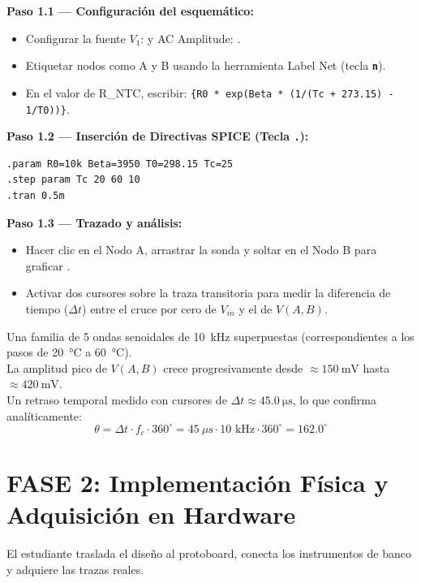 \documentclass[11pt,a4paper]{article}
\newcommand{\tecla}[1]{\colorbox{gray!20}{\texttt{\footnotesize\textbf{#1}}}}
\newcommand{\spice}[1]{\texttt{\color{purple}#1}}
\begin{document}
\textbf{Paso 1.1 — Configuración del esquemático:}
\begin{itemize}[itemsep=1pt]
    \item Configurar la fuente $V_1$:  y AC Amplitude: .
    \item Etiquetar nodos como A y B usando la herramienta Label Net (tecla \tecla{n}).
    \item En el valor de R\_NTC, escribir: \spice{\{R0 * exp(Beta * (1/(Tc + 273.15) - 1/T0))\}}.
\end{itemize}

\textbf{Paso 1.2 — Inserción de Directivas SPICE (Tecla \tecla{.}):}
\begin{lstlisting}[language=SPICE, numbers=none]
.param R0=10k Beta=3950 T0=298.15 Tc=25
.step param Tc 20 60 10
.tran 0.5m
\end{lstlisting}

\textbf{Paso 1.3 — Trazado y análisis:}
\begin{itemize}[itemsep=1pt]
    \item Hacer clic en el Nodo A, arrastrar la sonda y soltar en el Nodo B para graficar .
    \item Activar dos cursores sobre la traza transitoria para medir la diferencia de tiempo ($\Delta t$) entre el cruce por cero de $V_{in}$ y el de $V(A,B)$.
\end{itemize}

\begin{resultado}
Una familia de 5 ondas senoidales de \qty{10}{\kilo\hertz} superpuestas (correspondientes a los pasos de \qty{20}{\celsius} a \qty{60}{\celsius}).\\
La amplitud pico de $V(A,B)$ crece progresivamente desde $\approx \qty{150}{\milli\volt}$ hasta $\approx \qty{420}{\milli\volt}$.\\
Un retraso temporal medido con cursores de $\Delta t \approx \qty{45.0}{\micro\second}$, lo que confirma analíticamente:
\begin{equation}
    \theta = \Delta t \cdot f_c \cdot 360^\circ = 45\ \mu\text{s} \cdot 10\text{ kHz} \cdot 360^\circ = 162.0^\circ
\end{equation}
\end{resultado}

\newpage
\section*{FASE 2: Implementación Física y Adquisición en Hardware}
El estudiante traslada el diseño al protoboard, conecta los instrumentos de banco y adquiere las trazas reales.
\end{document}
